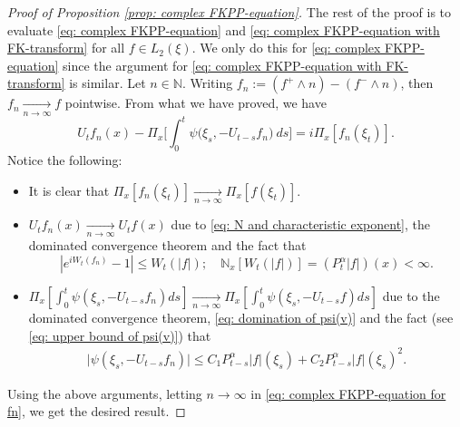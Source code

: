 \documentclass[12pt,a4paper]{amsart}
\theoremstyle{plain}
\theoremstyle{definition}
\numberwithin{equation}{section}
\begin{document}
\begin{proof}[Proof of Proposition \ref{prop: complex FKPP-equation}]
    The rest of the proof is to evaluate \eqref{eq: complex FKPP-equation} and \eqref{eq: complex FKPP-equation with FK-transform} for all $f\in L_2(\xi)$. We only do this for \eqref{eq: complex FKPP-equation} since the argument for \eqref{eq: complex FKPP-equation with FK-transform} is similar.
    Let $n \in \mathbb N$.
    Writing $f_n := (f^+ \wedge n) - (f^- \wedge n)$, then $f_n \xrightarrow[n\to \infty]{} f$ pointwise.
    From what we have proved, we have
\begin{equation}
\label{eq: complex FKPP-equation for fn}
    U_tf_n(x) - \Pi_{x} \Big[\int_0^t \psi\big(\xi_s, - U_{t-s}f_n\big) ~ds\Big]
    = i \Pi_{x} [f_n(\xi_t)].
\end{equation}
    Notice the following:
\begin{itemize}
\item
    It is clear that $\Pi_{x}[f_n(\xi_t)] \xrightarrow[n\to \infty]{} \Pi_{x}[f(\xi_t)]$.
\item
     $U_tf_n(x) \xrightarrow[n\to \infty]{} U_tf(x)$ due to \eqref{eq: N and characteristic exponent}, the dominated convergence theorem and the fact that
\[
    |e^{i W_t(f_n)} - 1| \leq W_t(|f|);
    \quad \mathbb N_x[W_t(|f|)] = (P_t^\alpha |f|)(x) < \infty.
\]
\item
     $\Pi_{x} [\int_0^t \psi(\xi_s,- U_{t-s}f_n)ds] \xrightarrow[n\to \infty]{} \Pi_{x} [\int_0^t \psi(\xi_s,- U_{t-s}f)ds]$ due to the dominated convergence theorem, \eqref{eq: domination of psi(v)} and the fact (see \eqref{eq: upper bound of psi(v)}) that
\begin{equation}\begin{split}
    \big|\psi(\xi_s,- U_{t-s}f_n)\big|
    \leq C_1 P_{t-s}^\alpha|f|(\xi_s)+C_2 P_{t-s}^\alpha|f|(\xi_s)^2.
\end{split}\end{equation}
\end{itemize}
    Using the above arguments, letting $n \to \infty$ in \eqref{eq: complex FKPP-equation for fn}, we get the desired result.
\end{proof}
\end{document}
